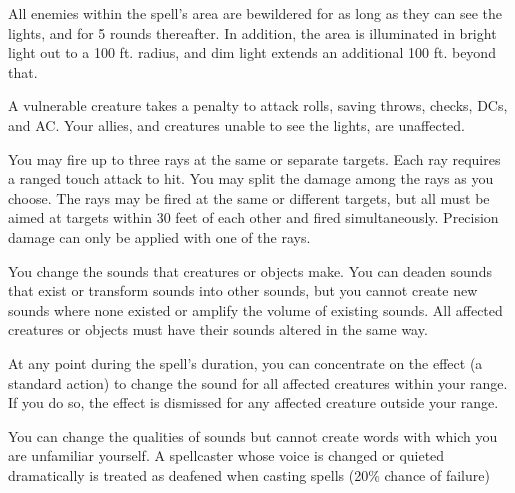 \spelldur{\durshort}
\begin{spelleffect}
  All enemies within the spell's area are bewildered for as long as they can see the lights, and for 5 rounds thereafter. In addition, the area is illuminated in bright light out to a 100 ft. radius, and dim light extends an additional 100 ft. beyond that.
\end{spelleffect}
\begin{spellnotes}
  A vulnerable creature takes a  penalty to attack rolls, saving throws, checks, DCs, and AC. Your allies, and creatures unable to see the lights, are unaffected.
\end{spellnotes}

\spellrng{\rngclose}
\begin{spelleffect}
  You may fire up to three rays at the same or separate targets. Each ray requires a ranged touch attack to hit. You may split the damage among the rays as you choose. The rays may be fired at the same or different targets, but all must be aimed at targets within 30 feet of each other and fired simultaneously. Precision damage can only be applied with one of the rays.
\end{spelleffect}

\spellrng{\rngmed}
\begin{spelleffect}
  You change the sounds that creatures or objects make. You can deaden sounds that exist or transform sounds into other sounds, but you cannot create new sounds where none existed or amplify the volume of existing sounds. All affected creatures or objects must have their sounds altered in the same way.
  
  At any point during the spell's duration, you can concentrate on the effect (a standard action) to change the sound for all affected creatures within your range. If you do so, the effect is dismissed for any affected creature outside your range.
\end{spelleffect}
\begin{spellnotes}
  You can change the qualities of sounds but cannot create words with which you are unfamiliar yourself. A spellcaster whose voice is changed or quieted dramatically is treated as deafened when casting spells (20\% chance of failure)
\end{spellnotes}

